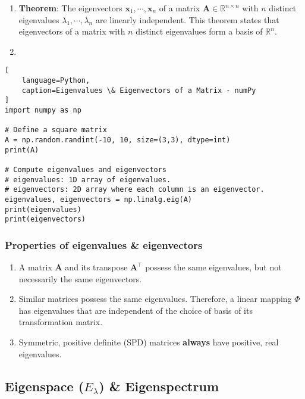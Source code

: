\begin{enumerate}
    \item \textbf{Theorem}: The eigenvectors $\bm{x}_1, \cdots , \bm{x}_n$ of a matrix $\bm{A} \in \mathbb{R}^{n\times n}$ with $n$ distinct eigenvalues $\lambda _1, \cdots , \lambda _n$ are linearly independent.
    This theorem states that eigenvectors of a matrix with $n$ distinct eigenvalues form a basis of $\mathbb{R}^n$.
    \hfill \cite{mfml/book/mml/Deisenroth-Faisal-Ong}

    \item 
\end{enumerate}




\begin{lstlisting}[
    language=Python,
    caption=Eigenvalues \& Eigenvectors of a Matrix - numPy
]
import numpy as np

# Define a square matrix
A = np.random.randint(-10, 10, size=(3,3), dtype=int)
print(A)

# Compute eigenvalues and eigenvectors
# eigenvalues: 1D array of eigenvalues.
# eigenvectors: 2D array where each column is an eigenvector.
eigenvalues, eigenvectors = np.linalg.eig(A)
print(eigenvalues)
print(eigenvectors)
\end{lstlisting}



\subsubsection{Properties of eigenvalues \& eigenvectors}

\begin{enumerate}
    \item A matrix $\bm{A}$ and its transpose $\bm{A}^\top$ possess the same eigenvalues, but not necessarily the same eigenvectors.
    \hfill \cite{mfml/book/mml/Deisenroth-Faisal-Ong}

    \item Similar matrices possess the same eigenvalues.
    Therefore, a linear mapping $\Phi$ has eigenvalues that are independent of the choice of basis of its transformation matrix.
    \hfill \cite{mfml/book/mml/Deisenroth-Faisal-Ong}

    \item Symmetric, positive definite (SPD) matrices \textbf{always} have positive, real eigenvalues.
    \hfill \cite{mfml/book/mml/Deisenroth-Faisal-Ong}
\end{enumerate}




\subsection{Eigenspace ($E_\lambda $) \& Eigenspectrum}

